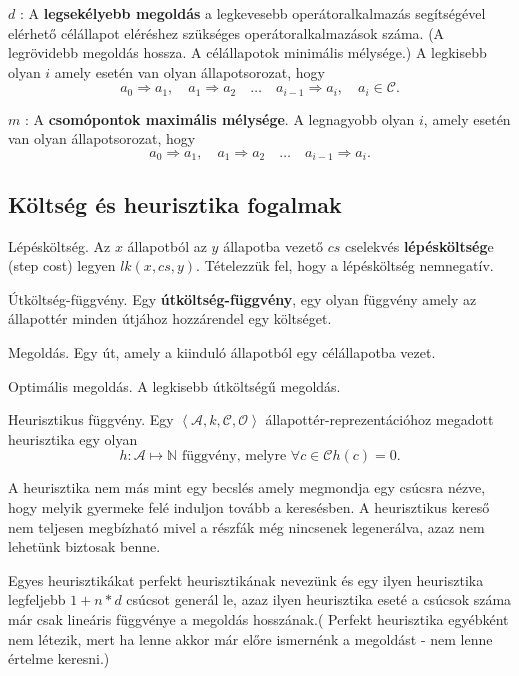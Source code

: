 $d$ : A {\bf legsekélyebb megoldás} a legkevesebb operátoralkalmazás
segítségével elérhető célállapot eléréshez szükséges operátoralkalmazások száma.
(A legrövidebb megoldás hossza. A célállapotok minimális mélysége.)
A legkisebb olyan $i$ amely esetén van olyan állapotsorozat, hogy \[
    a_0 \Rightarrow a_1, \quad a_1 \Rightarrow a_2 \quad \ldots \quad a_{i-1}
    \Rightarrow a_i,\quad a_i \in \mathcal{C}
.\]

$m$ : A {\bf csomópontok maximális mélysége}. A legnagyobb olyan $i$, amely esetén
van olyan állapotsorozat, hogy \[
    a_0 \Rightarrow a_1,\quad a_1 \Rightarrow a_2 \quad \ldots \quad a_{i-1}
    \Rightarrow a_i
.\]


\subsection{Költség és heurisztika fogalmak}

\begin{definicio}
    Lépésköltség.
    Az $x$ állapotból az $y$ állapotba vezető $cs$ cselekvés
    \textbf{lépésköltség}e (step cost) legyen $lk(x, cs, y)$.  Tételezzük fel,
    hogy a lépésköltség nemnegatív.
\end{definicio}

\begin{definicio}
    Útköltség-függvény.
    Egy \textbf{útköltség-függvény}, egy olyan függvény amely az állapottér
    minden útjához hozzárendel egy költséget.
\end{definicio}

\begin{definicio}
    Megoldás.
    Egy út, amely a kiinduló állapotból egy célállapotba vezet.
\end{definicio}

\begin{definicio}
    Optimális megoldás.
    A legkisebb útköltségű megoldás.
\end{definicio}

\begin{definicio}
    Heurisztikus függvény.
    Egy $\left<\mathcal{A}, k, \mathcal{C}, \mathcal{O} \right>$
    állapottér-reprezentációhoz megadott heurisztika egy olyan \[
        h : \mathcal{A} \mapsto \mathbb{N} \text{ függvény, melyre }
        \forall c \in \mathcal{C} h(c) = 0
    .\]

    A heurisztika nem más mint egy becslés amely megmondja egy csúcsra nézve,
    hogy melyik gyermeke felé induljon tovább a keresésben. A heurisztikus
    kereső nem teljesen megbízható mivel a részfák még nincsenek legenerálva,
    azaz nem lehetünk biztosak benne.

    Egyes heurisztikákat perfekt heurisztikának nevezünk és egy ilyen
    heurisztika legfeljebb $1+n*d$ csúcsot generál le, azaz ilyen heurisztika
    eseté a csúcsok száma már csak lineáris függvénye a megoldás hosszának.(
    Perfekt heurisztika egyébként nem létezik, mert ha lenne akkor már előre
    ismernénk a megoldást - nem lenne értelme keresni.)
\end{definicio}
